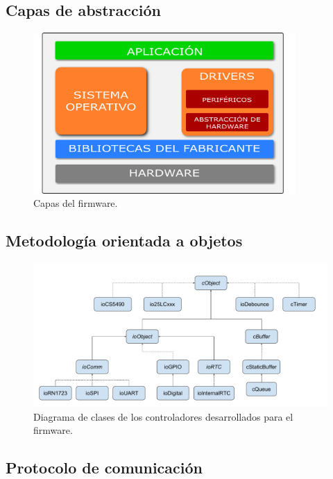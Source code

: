 \subsection{Capas de abstracción}

\begin{figure}[h]
	\centering
	\includegraphics[width=10cm]{./Figures/3_2_2_firmware_diagrama_capas.png}
	\caption{Capas del firmware.}
	\label{fig:firmware_diagrama_capas}
\end{figure}


\subsection{Metodología orientada a objetos}

\begin{figure}[h]
	\centering
	\includegraphics[width=14cm]{./Figures/3_2_3_diagrama-clases-simplificado.pdf}
	\caption{Diagrama de clases de los controladores desarrollados para el firmware.}
	\label{fig:firmware_diagrama_clases}
\end{figure}


\subsection{Protocolo de comunicación}
\label{subsection:protocolo}

